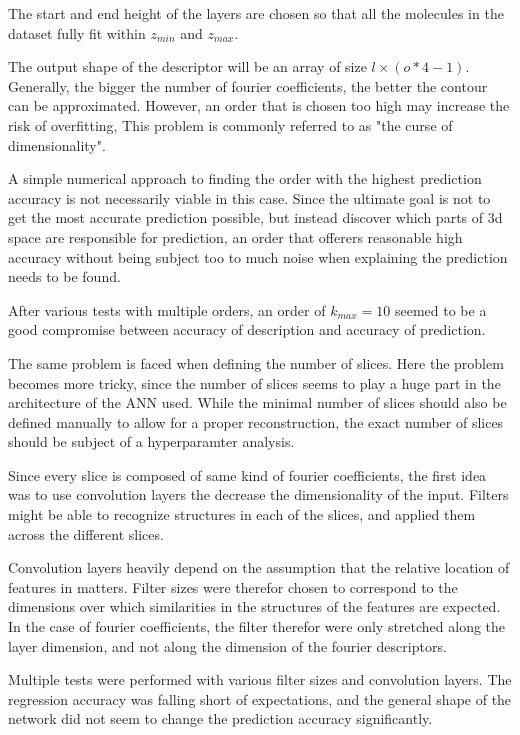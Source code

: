 The start and end height of the layers are chosen so that all the molecules in the dataset fully fit within $z_{min}$ and $z_{max}$.

The output shape of the descriptor will be an array of size $l \times (o * 4 - 1)$.
Generally, the bigger the number of fourier coefficients, the better the contour can be approximated.
However, an order that is chosen too high may increase the risk of overfitting, 
This problem is commonly referred to as "the curse of dimensionality".

A simple numerical approach to finding the order with the highest prediction accuracy is not necessarily viable in this case.
Since the ultimate goal is not to get the most accurate prediction possible, but instead discover which parts of 3d space 
are responsible for prediction, an order that offerers reasonable high accuracy without being subject too to much noise when explaining the 
prediction needs to be found. %

After various tests with multiple orders, an order of $k_{max} = 10$ seemed to be a good compromise between accuracy of description and accuracy of prediction.

The same problem is faced when defining the number of slices.
Here the problem becomes more tricky, since the number of slices seems to play a huge part in the architecture of the ANN used.
While the minimal number of slices should also be defined manually to allow for a proper reconstruction, the exact number of slices should be subject of a hyperparamter analysis.


Since every slice is composed of same kind of fourier coefficients, the first idea was to use convolution layers the decrease the dimensionality of the input.
Filters might be able to recognize structures in each of the slices, and applied them across the different slices.

Convolution layers heavily depend on the assumption that the relative location of features in matters.
Filter sizes were therefor chosen to correspond to the dimensions over which similarities in the structures of the features are expected.
In the case of fourier coefficients, the filter therefor were only stretched along the layer dimension, and not along the dimension of the fourier descriptors.

Multiple tests were performed with various filter sizes and convolution layers.
The regression accuracy was falling short of expectations, and the general shape of the network did not seem to change the prediction accuracy significantly.

